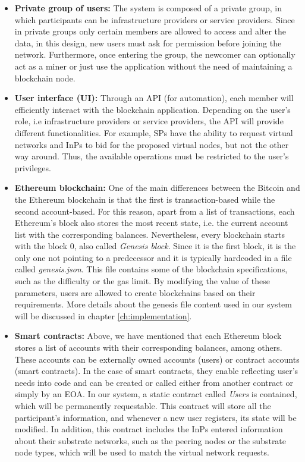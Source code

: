 \begin{itemize}
    \item \textbf{Private group of users:} The system is composed of a private group, in which participants can be infrastructure providers or service providers. Since in private groups only certain members are allowed to access and alter the data, in this design, new users must ask for permission before joining the network. Furthermore, once entering the group, the newcomer can optionally act as a miner or just use the application without the need of maintaining a blockchain node.
	\item \textbf{User interface (UI):} Through an API (for automation), each member will efficiently interact with the blockchain application. Depending on the user's role, i.e infrastructure providers or service providers, the API will provide different functionalities. For example, SPs have the ability to request virtual networks and InPs to bid for the proposed virtual nodes, but not the other way around. Thus, the available operations must be restricted to the user's privileges.
	\item \textbf{Ethereum blockchain:} One of the main differences between the Bitcoin and the Ethereum blockchain is that the first is transaction-based while the second account-based. For this reason, apart from a list of transactions, each Ethereum's block also stores the most recent state, i.e. the current account list with the corresponding balances. Nevertheless, every blockchain starts with the block 0, also called \textit{Genesis block}. Since it is the first block, it is the only one not pointing to a predecessor and it is typically hardcoded in a file called \textit{genesis.json}. This file contains some of the blockchain specifications, such as the difficulty or the gas limit. By modifying the value of these parameters, users are allowed to create blockchains based on their requirements. More details about the genesis file content used in our system will be discussed in chapter \ref{ch:implementation}.
	\item \textbf{Smart contracts:} Above, we have mentioned that each Ethereum block stores a list of accounts with their corresponding balances, among others. These accounts can be externally owned accounts (users) or contract accounts (smart contracts). In the case of smart contracts, they enable reflecting user's needs into code and can be created or called either from another contract or simply by an EOA. In our system, a static contract called \textit{Users} is contained, which will be permanently requestable. This contract will store all the participant's information, and whenever a new user registers, its state will be modified. In addition, this contract includes the InPs entered information about their substrate networks, such as the peering nodes or the substrate node types, which will be used to match the virtual network requests.
\end{itemize}

